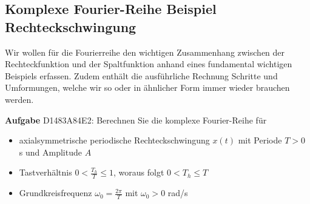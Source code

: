\subsection{Komplexe Fourier-Reihe Beispiel Rechteckschwingung}
\label{sec:D1483A84E2}
%
\begin{Ziel}
Wir wollen für die Fourierreihe den wichtigen Zusammenhang zwischen der Rechteckfunktion
und der Spaltfunktion anhand eines fundamental wichtigen Beispiels erfassen. Zudem enthält die
ausführliche Rechnung Schritte und Umformungen, welche wir so oder in ähnlicher Form
immer wieder brauchen werden.
\end{Ziel}
\textbf{Aufgabe} {\tiny D1483A84E2}: Berechnen Sie die komplexe Fourier-Reihe für
\begin{itemize}
\item axialsymmetrische periodische Rechteckschwingung $x(t)$ mit Periode $T>0$ s
und Amplitude $A$
\item Tastverhältnis $0<\frac{T_h}{T}\leq 1$, woraus folgt $0 < T_h \leq T$
\item Grundkreisfrequenz $\omega_0 = \frac{2\pi}{T}$ mit $\omega_0>0$ rad/s
\end{itemize}
%
\begin{figure}[h!]
\centering
{}
\end{figure}
%
